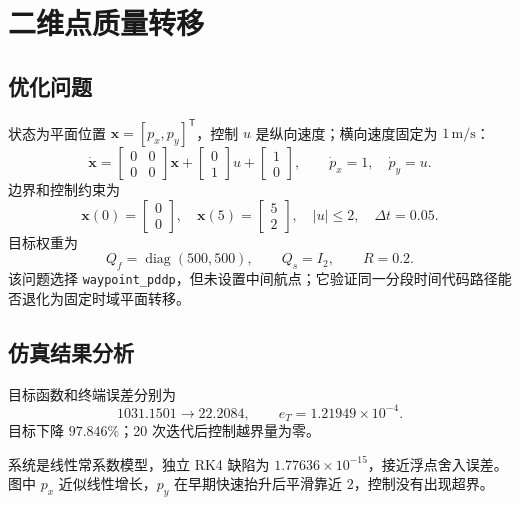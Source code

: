 \documentclass[UTF8,zihao=-4,openany,fontset=fandol]{ctexbook}
\newcommand{\code}[1]{\nolinkurl{#1}}
\newcommand{\diag}{\operatorname{diag}}
\begin{document}
\section{二维点质量转移}

\subsection{优化问题}

状态为平面位置 $\bm x=[p_x,p_y]^\mathsf{T}$，控制 $u$ 是纵向速度；横向速度固定为 $1\,\mathrm{m/s}$：
\begin{equation}
  \dot{\bm x}=
  \begin{bmatrix}0&0\\0&0\end{bmatrix}\bm x+
  \begin{bmatrix}0\\1\end{bmatrix}u+
  \begin{bmatrix}1\\0\end{bmatrix},
  \qquad
  \dot p_x=1,\quad \dot p_y=u.
\end{equation}
边界和控制约束为
\begin{equation}
  \bm x(0)=
  \begin{bmatrix}0\\0\end{bmatrix},\quad
  \bm x(5)=
  \begin{bmatrix}5\\2\end{bmatrix},\quad
  |u|\le2,\quad \Delta t=0.05.
\end{equation}
目标权重为
\begin{equation}
  Q_f=\diag(500,500),\qquad Q_s=I_2,\qquad R=0.2.
\end{equation}
该问题选择 \code{waypoint_pddp}，但未设置中间航点；它验证同一分段时间代码路径能否退化为固定时域平面转移。

\subsection{仿真结果分析}

目标函数和终端误差分别为
\[
  1031.1501\longrightarrow22.2084,\qquad
  e_T=1.21949\times10^{-4}.
\]
目标下降 $97.846\%$；20 次迭代后控制越界量为零。

系统是线性常系数模型，独立 RK4 缺陷为
$1.77636\times10^{-15}$，接近浮点舍入误差。图中 $p_x$ 近似线性增长，$p_y$ 在早期快速抬升后平滑靠近 $2$，控制没有出现超界。
\end{document}
